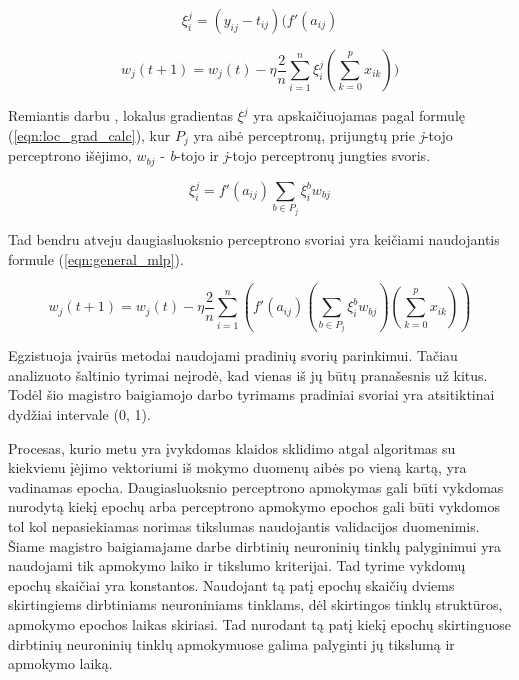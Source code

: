 \begin{equation}
\label{eqn:loc_grad}
	\xi^j_i = (y_{ij} - t_{ij})(f'(a_{ij})
\end{equation}

\begin{equation}
\label{eqn:general_with_loc_grad}
	w_j(t + 1) = w_j(t) - \eta \dfrac{2}{n}\sum_{i = 1}^{n} \xi^j_i(\sum_{k = 0}^{p} x_{ik}))
\end{equation}

Remiantis darbu \cite{feedbackAlg}, lokalus gradientas $\xi^j$ yra apskaičiuojamas pagal formulę (\ref{eqn:loc_grad_calc}), kur $P_j$ yra aibė perceptronų, prijungtų prie \textit{j}-tojo perceptrono išėjimo, $w_{bj}$ - \textit{b}-tojo ir \textit{j}-tojo perceptronų jungties svoris.

\begin{equation}
\label{eqn:loc_grad_calc}
	\xi^j_i = f'(a_{ij})\sum_{b \in P_j}\xi^b_i w_{bj}
\end{equation}

Tad bendru atveju daugiasluoksnio perceptrono svoriai yra keičiami naudojantis formule (\ref{eqn:general_mlp}).

\begin{equation}
\label{eqn:general_mlp}
w_j(t + 1) = w_j(t) - \eta \dfrac{2}{n}\sum_{i = 1}^{n} (f'(a_{ij})(\sum_{b \in P_j}\xi^b_i w_{bj})(\sum_{k = 0}^{p} x_{ik}))
\end{equation}

Egzistuoja įvairūs metodai naudojami pradinių svorių parinkimui. Tačiau analizuoto šaltinio \cite{initNN} tyrimai neįrodė, kad vienas iš jų būtų pranašesnis už kitus. Todėl šio magistro baigiamojo darbo tyrimams pradiniai svoriai yra atsitiktinai dydžiai intervale (0, 1).

Procesas, kurio metu yra įvykdomas klaidos sklidimo atgal algoritmas su kiekvienu įėjimo vektoriumi iš mokymo duomenų aibės po vieną kartą, yra vadinamas epocha. Daugiasluoksnio perceptrono apmokymas gali būti vykdomas nurodytą kiekį epochų arba perceptrono apmokymo epochos gali būti vykdomos tol kol nepasiekiamas norimas tikslumas naudojantis validacijos duomenimis. Šiame magistro baigiamajame darbe dirbtinių neuroninių tinklų palyginimui yra naudojami tik apmokymo laiko ir tikslumo kriterijai. Tad tyrime vykdomų epochų skaičiai yra konstantos. Naudojant tą patį epochų skaičių dviems skirtingiems dirbtiniams neuroniniams tinklams, dėl skirtingos tinklų struktūros, apmokymo epochos laikas skiriasi. Tad nurodant tą patį kiekį epochų skirtinguose dirbtinių neuroninių tinklų apmokymuose galima palyginti jų tikslumą ir apmokymo laiką.

